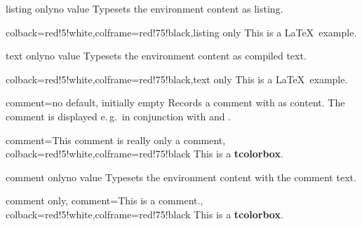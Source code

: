 \begin{docTcbKey}{listing only}{}{no value}
  Typesets the environment content as listing.
\begin{dispExample}
\begin{tcblisting}{colback=red!5!white,colframe=red!75!black,listing only}
This is a \LaTeX\ example.
\end{tcblisting}
\end{dispExample}
\end{docTcbKey}


\clearpage
\begin{docTcbKey}{text only}{}{no value}
  Typesets the environment content as compiled text.
\begin{dispExample}
\begin{tcblisting}{colback=red!5!white,colframe=red!75!black,text only}
This is a \LaTeX\ example.
\end{tcblisting}
\end{dispExample}
\end{docTcbKey}



\begin{docTcbKey}{comment}{=}{no default, initially empty}
  Records a comment with  as content. The comment is displayed
   e.\,g.\ in conjunction with 
  and .
\begin{dispExample}
\begin{tcblisting}{comment={This comment is really only a comment},
  colback=red!5!white,colframe=red!75!black}
This is a \textbf{tcolorbox}.
\end{tcblisting}
\end{dispExample}
\end{docTcbKey}


\begin{docTcbKey}[][doc new=2014-11-17]{comment only}{}{no value}
  Typesets the environment content with the comment text.
\begin{dispExample}
\begin{tcblisting}{comment only,
  comment={This is a comment.},
  colback=red!5!white,colframe=red!75!black}
This is a \textbf{tcolorbox}.
\end{tcblisting}
\end{dispExample}
\end{docTcbKey}





